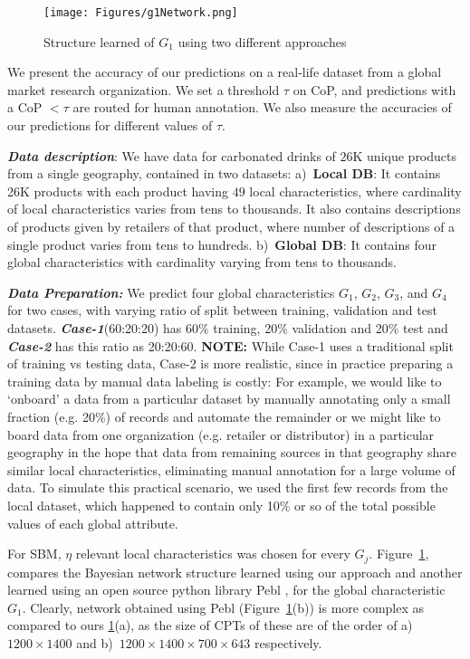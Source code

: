 \begin{figure}
\centering
\texttt{[image: Figures/g1Network.png]}
\vspace{6pt}
\caption{Structure learned of $G_1$ using two different approaches}
\label{fig:g1net}
\end{figure}

We present the accuracy of our predictions on a real-life dataset from a global market research organization. We set a threshold $\tau$ on CoP, and predictions with a CoP $< \tau$ are routed for human annotation. We also measure the accuracies of our predictions for different values of $\tau$.

\textit{\textbf{Data description}}: We have data for carbonated drinks of $26$K unique products from a single geography, contained in two datasets:
a)~\textbf{Local DB}: It contains 26K products with each product having $49$ local characteristics, where cardinality of local characteristics varies from tens to thousands. It also contains descriptions of products given by retailers of that product, where number of descriptions of a single product varies from tens to hundreds. b)~\textbf{Global DB}: It contains four global characteristics with cardinality varying from tens to thousands.

\textbf{\textit{Data Preparation:}} We predict four global characteristics $G_1$, $G_2$, $G_3$, and $G_4$ for two cases, with varying ratio of split between training, validation and test datasets. \textbf{\textit{Case-1}}(60:20:20) has 60\% training, 20\% validation and 20\% test and \textbf{\textit{Case-2}} has this ratio as 20:20:60. \textbf{NOTE:} While Case-1 uses a traditional split of training vs testing data, Case-2 is more realistic, since in practice preparing a training data by manual data labeling is costly: For example, we would like to `onboard' a data from a particular dataset 
by manually annotating only a small fraction (e.g. 20\%) of records and automate the remainder or we might like to board 
data from one organization (e.g. retailer or distributor) in a particular geography in the hope that data from remaining sources in that
geography share similar local characteristics, eliminating manual annotation for a large volume of data. 
To simulate this practical scenario, we used the first few records from the local dataset, which happened to contain only 10\% or so of the
total possible values of each global attribute.

For SBM, $\eta$ relevant local characteristics was chosen for every $G_j$. Figure~\ref{fig:g1net}, compares the Bayesian network structure learned using our approach and another learned using an open source python library Pebl \cite{shah2009python}, for the global characteristic $G_1$. Clearly, network obtained using Pebl (Figure~\ref{fig:g1net}(b)) is more complex as compared to ours \ref{fig:g1net}(a), as the size of CPTs of these are of the order of a)~$1200\times1400$ and b)~$1200\times1400\times700\times643$ respectively. %

